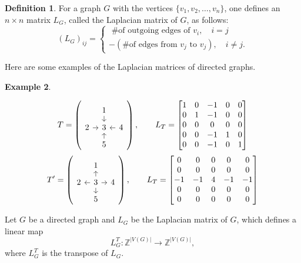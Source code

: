\documentclass[11pt,reqno]{amsart}
\theoremstyle{definition}
\newtheorem{mydef}{Definition}[section]
\newtheorem{myeg}[mydef]{Example}
\theoremstyle{plain}
\begin{document}
\begin{mydef}\label{definition: directed laplacian}
	For a graph $G$ with the vertices $\{v_1,v_2,\dots,v_n\}$, one defines an $n\times n$ matrix $L_G$, called the Laplacian matrix of $G$, as follows:
	\[
	(L_G)_{ij}=\begin{cases}
		\textrm{ \# of outgoing edges of $v_i$}, \quad i=j\\
		-(\textrm{\# of edges from $v_j$ to $v_j$}), \quad i \neq j.
	\end{cases}
	\]
\end{mydef}

Here are some examples of the Laplacian matrices of directed graphs.

\begin{myeg}\label{example: laplacian}

\begin{equation}
	T=\left(\begin{tikzcd}[row sep=0.25cm, column sep=0.25cm]
		& 1 \arrow[d] & \\
		2 \arrow[r]& 3 & 4 \arrow[l]\\
		& 5 \arrow[u] &
	\end{tikzcd} \right), \qquad L_T = \begin{bmatrix}
	1& 0& -1&0 &0 \\
	0 & 1 & -1 & 0 &0\\
	0& 0& 0& 0 &0\\
	0& 0&-1&1 & 0\\
	0& 0&-1&0 & 1
\end{bmatrix}
\end{equation}
\vspace{0.1cm}
\begin{equation}
	T'=\left(\begin{tikzcd}[row sep=0.25cm, column sep=0.25cm]
		& 1 & \\
		2 & 3 \arrow[u] \arrow[r]\arrow[l] \arrow[d]& 4 \\
		& 5  &
	\end{tikzcd} \right), \qquad L_T = \begin{bmatrix}
	0& 0& 0&0 &0 \\
	0 & 0 & 0 & 0 &0\\
	-1& -1& 4& -1 &-1\\
	0& 0&0&0 & 0\\
	0& 0&0&0 & 0
\end{bmatrix}
\end{equation}
\end{myeg}

Let $G$ be a directed graph and $L_G$ be the Laplacian matrix of $G$, which defines a linear map
\begin{equation}\label{eq: laplacian}
L_G^T:\mathbb{Z}^{|V(G)|} \to \mathbb{Z}^{|V(G)|},
\end{equation}
where $L_G^T$ is the transpose of $L_G$. 
\end{document}
